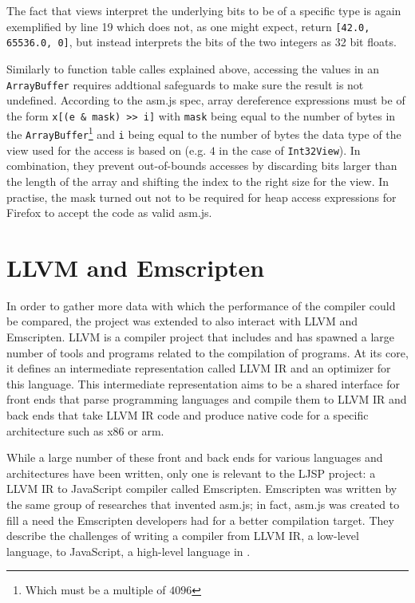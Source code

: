 \documentclass[11pt]{report}
\begin{document}
The fact that views interpret the underlying bits to be of a specific type is again exemplified by line 19 which does not, as one might expect, return \texttt{[42.0, 65536.0, 0]}, but instead interprets the bits of the two integers as 32 bit floats.

Similarly to function table calles explained above, accessing the values in an \texttt{ArrayBuffer} requires addtional safeguards to make sure the result is not undefined. According to the asm.js spec, array dereference expressions must be of the form \texttt{x[(e \& mask) {>}> i]} with \texttt{mask} being equal to the number of bytes in the \texttt{ArrayBuffer}\footnote{Which must be a multiple of $4096$} and \texttt{i} being equal to the number of bytes the data type of the view used for the access is based on (e.g. $4$ in the case of \texttt{Int32View}). In combination, they prevent out-of-bounds accesses by discarding bits larger than the length of the array and shifting the index to the right size for the view. In practise, the mask turned out not to be required for heap access expressions for Firefox to accept the code as valid asm.js.

\section{LLVM and Emscripten}
In order to gather more data with which the performance of the compiler could be compared, the project was extended to also interact with LLVM and Emscripten. LLVM is a compiler project that includes and has spawned a large number of tools and programs related to the compilation of programs. At its core, it defines an intermediate representation called LLVM IR and an optimizer for this language. This intermediate representation aims to be a shared interface for front ends that parse programming languages and compile them to LLVM IR and back ends that take LLVM IR code and produce native code for a specific architecture such as x86 or arm. 

While a large number of these front and back ends for various languages and architectures have been written, only one is relevant to the LJSP project: a LLVM IR to JavaScript compiler called Emscripten. Emscripten was written by the same group of researches that invented asm.js; in fact, asm.js was created to fill a need the Emscripten developers had for a better compilation target. They describe the challenges of writing a compiler from LLVM IR, a low-level language, to JavaScript, a high-level language in \cite{emscriptenpapar}.
\end{document}
